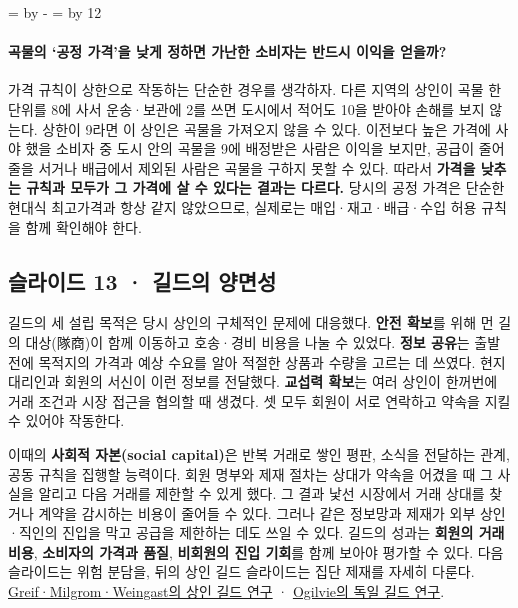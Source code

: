 \documentclass[10pt,a4paper]{article}
\newcommand{\ReserveQuestionSpace}{%
  \par\begingroup
  \dimen0=\pagegoal \advance\dimen0 by -\pagetotal
  \dimen2=\baselineskip \multiply\dimen2 by 12
  \ifdim\dimen0<\dimen2 \newpage\fi
  \endgroup}
\begin{document}
\ReserveQuestionSpace
\paragraph{곡물의 ‘공정 가격’을 낮게 정하면 가난한 소비자는 반드시 이익을 얻을까?}

가격 규칙이 상한으로 작동하는 단순한 경우를 생각하자. 다른 지역의 상인이 곡물 한 단위를 8에 사서 운송·보관에 2를 쓰면 도시에서 적어도 10을 받아야 손해를 보지 않는다. 상한이 9라면 이 상인은 곡물을 가져오지 않을 수 있다. 이전보다 높은 가격에 사야 했을 소비자 중 도시 안의 곡물을 9에 배정받은 사람은 이익을 보지만, 공급이 줄어 줄을 서거나 배급에서 제외된 사람은 곡물을 구하지 못할 수 있다. 따라서 \textbf{가격을 낮추는 규칙과 모두가 그 가격에 살 수 있다는 결과는 다르다.} 당시의 공정 가격은 단순한 현대식 최고가격과 항상 같지 않았으므로, 실제로는 매입·재고·배급·수입 허용 규칙을 함께 확인해야 한다.\par

\subsection{슬라이드 13 · 길드의 양면성}
길드의 세 설립 목적은 당시 상인의 구체적인 문제에 대응했다. \textbf{안전 확보}를 위해 먼 길의 대상(隊商)이 함께 이동하고 호송·경비 비용을 나눌 수 있었다. \textbf{정보 공유}는 출발 전에 목적지의 가격과 예상 수요를 알아 적절한 상품과 수량을 고르는 데 쓰였다. 현지 대리인과 회원의 서신이 이런 정보를 전달했다. \textbf{교섭력 확보}는 여러 상인이 한꺼번에 거래 조건과 시장 접근을 협의할 때 생겼다. 셋 모두 회원이 서로 연락하고 약속을 지킬 수 있어야 작동한다.\par

이때의 \textbf{사회적 자본(social capital)}은 반복 거래로 쌓인 평판, 소식을 전달하는 관계, 공동 규칙을 집행할 능력이다. 회원 명부와 제재 절차는 상대가 약속을 어겼을 때 그 사실을 알리고 다음 거래를 제한할 수 있게 했다. 그 결과 낯선 시장에서 거래 상대를 찾거나 계약을 감시하는 비용이 줄어들 수 있다. 그러나 같은 정보망과 제재가 외부 상인·직인의 진입을 막고 공급을 제한하는 데도 쓰일 수 있다. 길드의 성과는 \textbf{회원의 거래 비용}, \textbf{소비자의 가격과 품질}, \textbf{비회원의 진입 기회}를 함께 보아야 평가할 수 있다. 다음 슬라이드는 위험 분담을, 뒤의 상인 길드 슬라이드는 집단 제재를 자세히 다룬다. \href{https://web.stanford.edu/\%7Eavner/Greif\_Papers/1994\%20Greif\%2C\%20Milgrom\%2C\%20and\%20Weingast\%20JPE\%201994.pdf}{Greif·Milgrom·Weingast의 상인 길드 연구} · \href{https://sheilaghogilvie.com/wp-content/uploads/publications/EcHR-2004-guilds.pdf}{Ogilvie의 독일 길드 연구}.\par
\end{document}
